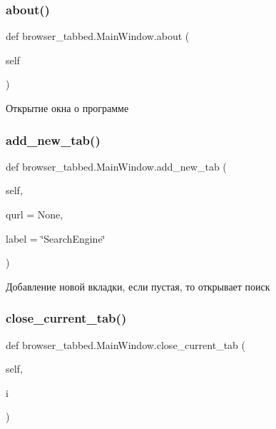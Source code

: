 \subsubsection{\texorpdfstring{about()}{about()}}
{\footnotesize\ttfamily def browser\+\_\+tabbed.\+Main\+Window.\+about (\begin{DoxyParamCaption}\item[{}]{self }\end{DoxyParamCaption})}

\begin{DoxyVerb}Открытие окна о программе\end{DoxyVerb}
 \mbox{\label{classbrowser__tabbed_1_1MainWindow_a96249e8bbbc2f6e52c8c6775770760e9}} 
\subsubsection{\texorpdfstring{add\_new\_tab()}{add\_new\_tab()}}
{\footnotesize\ttfamily def browser\+\_\+tabbed.\+Main\+Window.\+add\+\_\+new\+\_\+tab (\begin{DoxyParamCaption}\item[{}]{self,  }\item[{}]{qurl = {\ttfamily None},  }\item[{}]{label = {\ttfamily \char`\"{}SearchEngine\char`\"{}} }\end{DoxyParamCaption})}

\begin{DoxyVerb}Добавление новой вкладки, если пустая, то открывает поиск\end{DoxyVerb}
 \mbox{\label{classbrowser__tabbed_1_1MainWindow_ada7aae65e67299b6d9a0661bf01a9523}} 
\subsubsection{\texorpdfstring{close\_current\_tab()}{close\_current\_tab()}}
{\footnotesize\ttfamily def browser\+\_\+tabbed.\+Main\+Window.\+close\+\_\+current\+\_\+tab (\begin{DoxyParamCaption}\item[{}]{self,  }\item[{}]{i }\end{DoxyParamCaption})}

